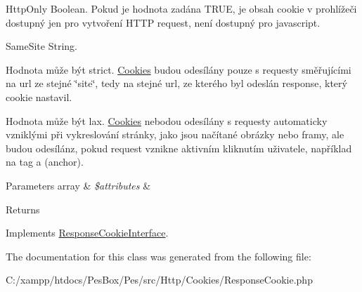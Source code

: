 \begin{DoxyItemize}
\item \textquotesingle{}Http\+Only\textquotesingle{} Boolean. Pokud je hodnota zadána T\+R\+UE, je obsah cookie v prohlížeči dostupný jen pro vytvoření H\+T\+TP request, není dostupný pro javascript. 
\item \textquotesingle{}Same\+Site\textquotesingle{} String. 
\begin{DoxyItemize}
\item Hodnota může být strict. \mbox{\hyperlink{namespace_pes_1_1_http_1_1_cookies}{Cookies}} budou odesílány pouze s requesty směřujícími na url ze stejné \char`\"{}site\char`\"{}, tedy na stejné url, ze kterého byl odeslán response, který cookie nastavil.  
\item Hodnota může být lax. \mbox{\hyperlink{namespace_pes_1_1_http_1_1_cookies}{Cookies}} nebodou odesílány s requesty automaticky vzniklými při vykreslování stránky, jako jsou načítané obrázky nebo framy, ale budou odesílánz, pokud request vznikne aktivním kliknutím uživatele, například na tag a (anchor).
\end{DoxyItemize}
\end{DoxyItemize}
\begin{DoxyParams}[1]{Parameters}
array & {\em \$attributes} & \\
\hline
\end{DoxyParams}
\begin{DoxyReturn}{Returns}

\end{DoxyReturn}


Implements \mbox{\hyperlink{interface_pes_1_1_http_1_1_cookies_1_1_response_cookie_interface}{Response\+Cookie\+Interface}}.



The documentation for this class was generated from the following file\+:\begin{DoxyCompactItemize}
\item 
C\+:/xampp/htdocs/\+Pes\+Box/\+Pes/src/\+Http/\+Cookies/Response\+Cookie.\+php\end{DoxyCompactItemize}
